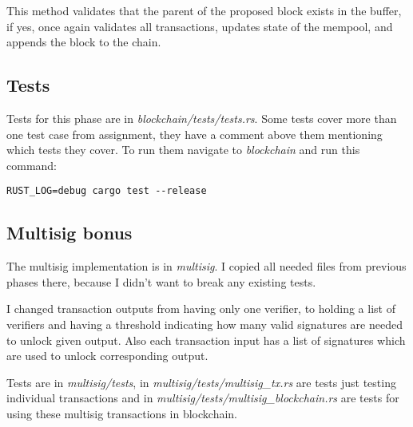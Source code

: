 This method validates that the parent of the proposed block exists in the buffer,
if yes, once again validates all transactions, updates state of the mempool, and
appends the block to the chain.

\subsection{Tests}

Tests for this phase are in \emph{blockchain/tests/tests.rs}. Some tests cover
more than one test case from assignment, they have a comment above them
mentioning which tests they cover. To run them navigate to \emph{blockchain}
and run this command:

\begin{verbatim}
RUST_LOG=debug cargo test --release 
\end{verbatim}

\subsection{Multisig bonus}

The multisig implementation is in \emph{multisig}. I copied all needed files
from previous phases there, because I didn't want to break any existing tests.

I changed transaction outputs from having only one verifier, to holding a list
of verifiers and having a threshold indicating how many valid signatures are
needed to unlock given output. Also each transaction input has a list of signatures
which are used to unlock corresponding output.

Tests are in \emph{multisig/tests}, in \emph{multisig/tests/multisig\_tx.rs} are
tests just testing individual transactions and in
\emph{multisig/tests/multisig\_blockchain.rs} are tests for using these multisig
transactions in blockchain.
